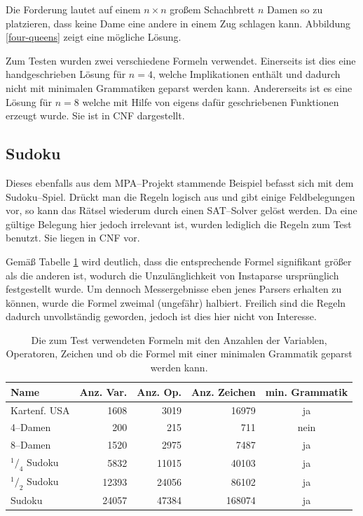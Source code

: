 \documentclass[ngerman,a4paper,abstracton,open=right,twoside=false,toc=listofnumbered,bibtotocnumbered]{scrreprt}
\begin{document}
Die Forderung lautet auf einem $n \times n$ großem Schachbrett $n$ Damen so zu platzieren, dass keine Dame eine andere in einem Zug schlagen kann. Abbildung \ref{four-queens} zeigt eine mögliche Lösung.

Zum Testen wurden zwei verschiedene Formeln verwendet. Einerseits ist dies eine handgeschrieben Lösung für $n = 4$, welche Implikationen enthält und dadurch nicht mit minimalen Grammatiken geparst werden kann. Andererseits ist es eine Lösung für $n = 8$ welche mit Hilfe von eigens dafür geschriebenen Funktionen erzeugt wurde. Sie ist in CNF dargestellt.

\subsection{Sudoku}

Dieses ebenfalls aus dem MPA--Projekt stammende Beispiel befasst sich mit dem Sudoku--Spiel. Drückt man die Regeln logisch aus und gibt einige Feldbelegungen vor, so kann das Rätsel wiederum durch einen SAT--Solver gelöst werden. Da eine gültige Belegung hier jedoch irrelevant ist, wurden lediglich die Regeln zum Test benutzt. Sie liegen in CNF vor.

Gemäß Tabelle \ref{formeln-zahlen} wird deutlich, dass die entsprechende Formel signifikant größer als die anderen ist, wodurch die Unzulänglichkeit von Instaparse ursprünglich festgestellt wurde. Um dennoch Messergebnisse eben jenes Parsers erhalten zu können, wurde die Formel zweimal (ungefähr) halbiert. Freilich sind die Regeln dadurch unvollständig geworden, jedoch ist dies hier nicht von Interesse.

\begin{table}[h]
	\begin{tabular}{|l|r|r|r|c|}
		\hline
		\textbf{Name} & \textbf{Anz. Var.} & \textbf{Anz. Op.} & \textbf{Anz. Zeichen} & \textbf{min. Grammatik} \\ \hline
		Kartenf. USA & 1608 & 3019 & 16979 & ja \\ \hline
		4--Damen & 200 & 215 & 711 & nein \\ \hline
		8--Damen & 1520 & 2975 & 7487 & ja \\ \hline
		$^1/_4$ Sudoku & 5832 & 11015 & 40103 & ja \\ \hline
		$^1/_2$ Sudoku & 12393 & 24056 & 86102 & ja \\ \hline
		Sudoku & 24057 & 47384 & 168074 & ja \\ \hline
	\end{tabular}
	\caption{Die zum Test verwendeten Formeln mit den Anzahlen der Variablen, Operatoren, Zeichen und ob die Formel mit einer minimalen Grammatik geparst werden kann.}
	\label{formeln-zahlen}
\end{table}
\end{document}
